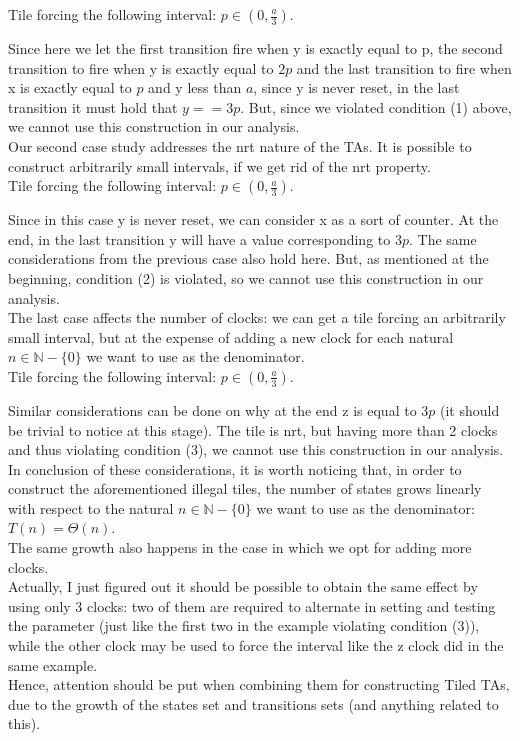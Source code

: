 \documentclass[12pt, a4paper]{article}
\begin{document}
Tile forcing the following interval: $p \in (0, \frac{a}{3})$.



\noindent
Since here we let the first transition fire when y is exactly equal to p, the second transition to fire when y is exactly equal to $2p$ and the last transition to fire when x is exactly equal to $p$ and y less than $a$, since y is never reset, in the last transition it must hold that $y == 3p$. But, since we violated condition (1) above, we cannot use this construction in our analysis.\\

\noindent
Our second case study addresses the nrt nature of the TAs. It is possible to construct arbitrarily small intervals, if we get rid of the nrt property.\\

Tile forcing the following interval: $p \in (0, \frac{a}{3})$.



\noindent
Since in this case y is never reset, we can consider x as a sort of counter. At the end, in the last transition y will have a value corresponding to $3p$. The same considerations from the previous case also hold here. But, as mentioned at the beginning, condition (2) is violated, so we cannot use this construction in our analysis.\\

\noindent
The last case affects the number of clocks: we can get a tile forcing an arbitrarily small interval, but at the expense of adding a new clock for each natural $n \in \mathbb{N}-\{0\}$ we want to use as the denominator.\\

Tile forcing the following interval: $p \in (0, \frac{a}{3})$.



\noindent
Similar considerations can be done on why at the end z is equal to $3p$ (it should be trivial to notice at this stage). The tile is nrt, but having more than 2 clocks and thus violating condition (3), we cannot use this construction in our analysis.\\

\noindent
In conclusion of these considerations, it is worth noticing that, in order to construct the aforementioned illegal tiles, the number of states grows linearly with respect to the natural $n \in \mathbb{N}-\{0\}$ we want to use as the denominator: $T(n) = \Theta(n)$.\\
The same growth also happens in the case in which we opt for adding more clocks.\\
Actually, I just figured out it should be possible to obtain the same effect by using only 3 clocks: two of them are required to alternate in setting and testing the parameter (just like the first two in the example violating condition (3)), while the other clock may be used to force the interval like the z clock did in the same example.\\
Hence, attention should be put when combining them for constructing Tiled TAs, due to the growth of the states set and transitions sets (and anything related to this).
\end{document}
